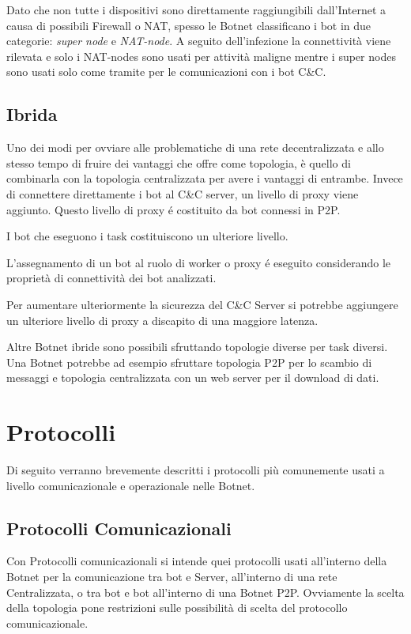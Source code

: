 Dato che non tutte i dispositivi sono direttamente raggiungibili dall'Internet a causa di possibili Firewall o NAT, spesso le Botnet classificano i bot in due categorie: \emph{super node} e \emph{NAT-node}.
A seguito dell'infezione la connettività viene rilevata e solo i NAT-nodes sono usati per attività maligne mentre i super nodes sono usati solo come tramite per le comunicazioni con i bot C\&C.

\subsection{Ibrida}
Uno dei modi per ovviare alle problematiche di una rete decentralizzata e allo stesso tempo di fruire dei vantaggi che offre come topologia, è quello di combinarla con la topologia centralizzata per avere i vantaggi di entrambe.
Invece di connettere direttamente i bot al C\&C server, un livello di proxy viene aggiunto. Questo livello di proxy é costituito da bot connessi in P2P. 

I bot che eseguono i task costituiscono un ulteriore livello. 

L'assegnamento di un bot al ruolo di worker o proxy é eseguito considerando le proprietà di connettività dei bot analizzati.

Per aumentare ulteriormente la sicurezza del C\&C Server si potrebbe aggiungere un ulteriore livello di proxy a discapito di una maggiore latenza.

Altre  Botnet ibride sono possibili sfruttando topologie diverse per task diversi. Una Botnet potrebbe ad esempio sfruttare topologia P2P per lo scambio di messaggi e topologia centralizzata con un web server per il download di dati.

\section{Protocolli}
Di seguito verranno brevemente descritti i protocolli più comunemente usati a livello comunicazionale e operazionale nelle Botnet. 
\subsection{Protocolli Comunicazionali}
Con Protocolli comunicazionali si intende quei protocolli usati all'interno della Botnet per la comunicazione tra bot e Server, all'interno di una rete Centralizzata, o tra bot e bot all'interno di una Botnet P2P.
Ovviamente la scelta della topologia pone restrizioni sulle possibilità di scelta del protocollo comunicazionale.

